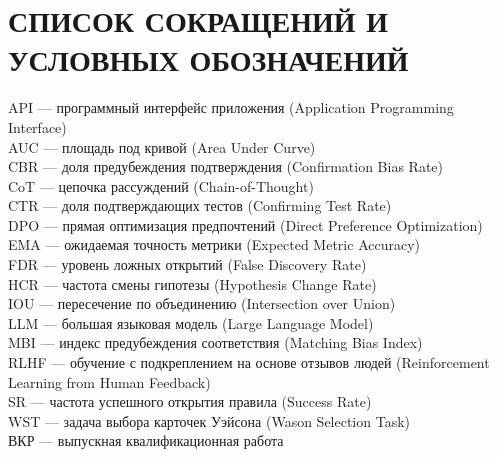 \chapter*{СПИСОК СОКРАЩЕНИЙ И УСЛОВНЫХ ОБОЗНАЧЕНИЙ}
\setlength{\parindent}{0pt}
API --- программный интерфейс приложения (Application Programming Interface)\\[0.5em]
AUC --- площадь под кривой (Area Under Curve)\\[0.5em]
CBR --- доля предубеждения подтверждения (Confirmation Bias Rate)\\[0.5em]
CoT --- цепочка рассуждений (Chain-of-Thought)\\[0.5em]
CTR --- доля подтверждающих тестов (Confirming Test Rate)\\[0.5em]
DPO --- прямая оптимизация предпочтений (Direct Preference Optimization)\\[0.5em]
EMA --- ожидаемая точность метрики (Expected Metric Accuracy)\\[0.5em]
FDR --- уровень ложных открытий (False Discovery Rate)\\[0.5em]
HCR --- частота смены гипотезы (Hypothesis Change Rate)\\[0.5em]
IOU --- пересечение по объединению (Intersection over Union)\\[0.5em]
LLM --- большая языковая модель (Large Language Model)\\[0.5em]
MBI --- индекс предубеждения соответствия (Matching Bias Index)\\[0.5em]
RLHF --- обучение с подкреплением на основе отзывов людей (Reinforcement Learning from Human Feedback)\\[0.5em]
SR --- частота успешного открытия правила (Success Rate)\\[0.5em]
WST --- задача выбора карточек Уэйсона (Wason Selection Task)\\[0.5em]
ВКР --- выпускная квалификационная работа
